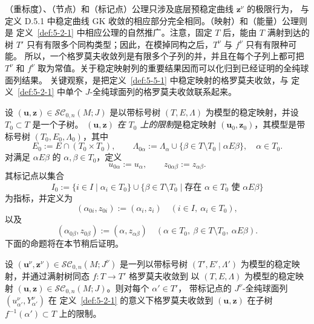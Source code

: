 （重标度）、（节点）和（标记点）公理只涉及底层预稳定曲线 $\mathbf z^\nu$ 的极限行为，
与定义 D.5.1 中稳定曲线 GK 收敛的相应部分完全相同。（映射）和（能量）公理则是
定义~\ref{def:5-2-1} 中相应公理的自然推广。注意，固定 $T$ 后，能由 $T$ 满射到达的树
$T'$ 只有有限多个同构类型；因此，在模掉同构之后，$T^\nu$ 与 $f^\nu$ 只有有限种可能。
所以，一个格罗莫夫收敛列是有限多个子列的并，并且在每个子列上都可把 $T^\nu$ 和
$f^\nu$ 取为常值。关于稳定映射列的重要结果因而可以化归到已经证明的全纯球面列结果。
关键观察，是把定义~\ref{def:5-5-1} 中稳定映射的格罗莫夫收敛，与
定义~\ref{def:5-2-1} 中单个 $J$-全纯球面列的格罗莫夫收敛联系起来。

设 $(\mathbf u,\mathbf z)\in\mathcal{SC}_{0,n}(M;J)$ 是以带标号树
$(T,E,\Lambda)$ 为模型的稳定映射，并设 $T_0\subset T$ 是一个子树。
$(\mathbf u,\mathbf z)$ \emph{在 $T_0$ 上的限制}是稳定映射
$(\mathbf u_0,\mathbf z_0)$，其模型是带标号树 $(T_0,E_0,\Lambda_0)$，其中
\[
  E_0:=E\cap(T_0\times T_0),
  \qquad
  \Lambda_{0\alpha}:=\Lambda_\alpha
    \cup\{\beta\in T\setminus T_0\mid \alpha E\beta\},
  \quad \alpha\in T_0.
\]
对满足 $\alpha E\beta$ 的 $\alpha,\beta\in T_0$，定义
\[
  u_{0\alpha}:=u_\alpha,
  \qquad z_{0\alpha\beta}:=z_{\alpha\beta}.
\]
其标记点以集合
\[
  I_0:=\{i\in I\mid \alpha_i\in T_0\}
  \cup\{\beta\in T\setminus T_0\mid
    \text{存在 }\alpha\in T_0\text{ 使 }\alpha E\beta\}
\]
为指标，并定义为
\[
  (\alpha_{0i},z_{0i}):=(\alpha_i,z_i)
  \quad(i\in I,\ \alpha_i\in T_0),
\]
以及
\[
  (\alpha_{0\beta},z_{0\beta}):=(\alpha,z_{\alpha\beta})
  \quad(\alpha\in T_0,\ \beta\in T\setminus T_0,\ \alpha E\beta).
\]
下面的命题将在本节稍后证明。

\begin{proposition}\label{prop:5-5-2}
设 $(\mathbf u^\nu,\mathbf z^\nu)\in\mathcal{SC}_{0,n}(M;J^\nu)$ 是一列以带标号树
$(T',E',\Lambda')$ 为模型的稳定映射，并通过满射树同态 $f:T\to T'$ 格罗莫夫收敛到
以 $(T,E,\Lambda)$ 为模型的稳定映射
$(\mathbf u,\mathbf z)\in\mathcal{SC}_{0,n}(M;J)$。则对每个 $\alpha'\in T'$，
带标记点的 $J^\nu$-全纯球面列 $(u_{\alpha'}^\nu,Y_{\alpha'}^\nu)$ 在
定义~\ref{def:5-2-1} 的意义下格罗莫夫收敛到
$(\mathbf u,\mathbf z)$ 在子树 $f^{-1}(\alpha')\subset T$ 上的限制。
\end{proposition}

